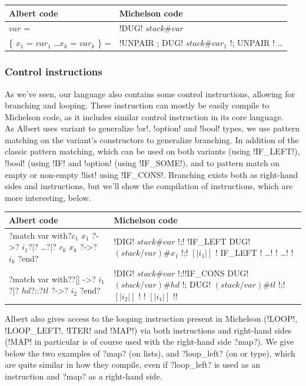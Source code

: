 \documentclass{report}
\begin{document}
{\small
\begin{longtable}{l|l}
  Albert code & Michelson code\\
  \hline
  $var$ = & !DUG! $stack\#var$\\
  \hline
  \{ $x_1$ = $var_1$ \ldots $x_k$ = $var_k$ \} = & !UNPAIR ; DUG! $stack\#var_1$ !; UNPAIR ! \ldots \\
\end{longtable}
}

\subsubsection{Control instructions}

As we've seen, our language also contains some control instructions, allowing for branching and looping. These instruction can mostly be easily compile to Michelson code, as it includes similar control instruction in its core language.\\

As Albert uses variant to generalize !or!, !option! and !bool! types, we use pattern matching on the variant's constructors to generalize branching. In addition of the classic pattern matching, which can be used on both variants (using !IF_LEFT!), !bool! (using !IF! and !option! (using !IF_SOME!), and to pattern match on empty or non-empty !list! using !IF_CONS!. Branching exists both as right-hand sides and instructions, but we'll show the compilation of instructions, which are more interesting, below.

{\small
\begin{longtable}{p{4cm}|p{11cm}}
  Albert code & Michelson code\\
  \hline
  ?match var with?\newline$c_1$ $x_1$ ?->? $i_1$?|? \ldots\newline?|? $c_k$ $x_k$ ?->? $i_k$ ?end? &
  !DIG! $stack\#var$ !;!\newline
  !IF_LEFT { DUG! $(stack/var)\#x_1$ !;! $[|i_1|]$ !} { IF_LEFT {! \ldots !} {! \ldots !} }!\\
  \hline
  ?match var with?\newline?[] ->? $i_1$\newline?|? $hd$?::?$tl$ ?->? $i_2$ ?end? &
  !DIG! $stack\#var$ !;!\newline !IF_CONS { DUG! $(stack/var)\#hd$ !; DUG! $(stack/var)\#tl$ !;! $[|i_2|]$ !} {! $[|i_1|]$ !}!
\end{longtable}
}

Albert also gives access to the looping instruction present in Michelson (!LOOP!, !LOOP_LEFT!, !ITER! and !MAP!) via both instructions and right-hand sides (!MAP! in particular is of course used with the right-hand side ?map?). We give below the two examples of ?map? (on lists), and ?loop_left? (on or type), which are quite similar in how they compile, even if ?loop_left? is used as an instruction and ?map? as a right-hand side.
\end{document}
